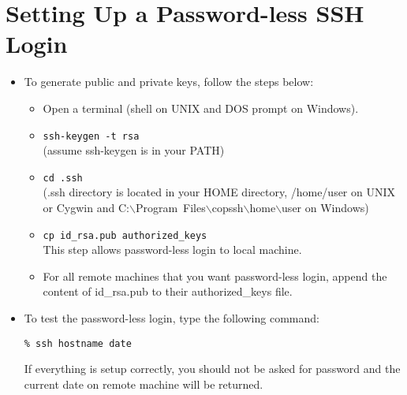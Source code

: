 \section{Setting Up a Password-less SSH Login}
\begin{itemize}
\item To generate public and private keys, follow the steps below:
\begin{itemize}
\item Open a terminal (shell on UNIX and DOS prompt on Windows).
\item \texttt{ssh-keygen -t rsa} \\ (assume ssh-keygen is in your PATH)
\item \texttt{cd .ssh} \\ (.ssh directory is located in your HOME directory,
/home/user on UNIX or Cygwin and
C:$\backslash$Program~Files$\backslash$copssh$\backslash$home$\backslash$user on Windows)
\item \texttt{cp id\_rsa.pub authorized\_keys} \\
This step allows password-less login to local machine. 
\item For all remote machines that you want password-less login, append the content of 
id\_rsa.pub to their authorized\_keys file.
\end{itemize}
\item To test the password-less login, type the following command:
\begin{verbatim}
% ssh hostname date
\end{verbatim}
If everything is setup correctly, you should not be asked for password and the
current date on remote machine will be returned. 
\end{itemize}
